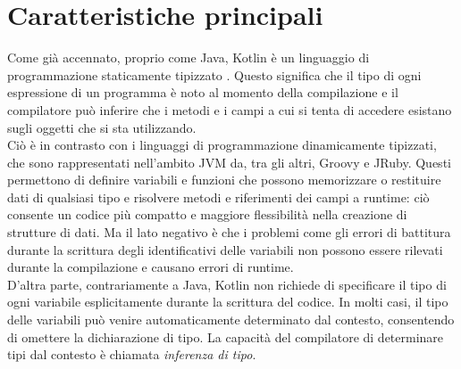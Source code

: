 \section{Caratteristiche principali}
Come già accennato, proprio come Java, Kotlin è un linguaggio di programmazione staticamente tipizzato \cite{kotlinWiki}.
Questo significa che il tipo di ogni espressione di un programma è noto al momento della compilazione
e il compilatore può inferire che i metodi e i campi a cui si tenta di accedere esistano sugli oggetti
che si sta utilizzando. \\
Ciò è in contrasto con i linguaggi di programmazione dinamicamente tipizzati, che sono
rappresentati nell'ambito JVM da, tra gli altri, Groovy e JRuby. Questi permettono di
definire variabili e funzioni che possono memorizzare o restituire dati di qualsiasi tipo e risolvere metodi
e riferimenti dei campi a runtime: ciò consente un codice più compatto e maggiore
flessibilità nella creazione di strutture di dati. Ma il lato negativo è che i problemi come gli errori
di battitura durante la scrittura degli identificativi delle variabili non possono essere rilevati durante
la compilazione e causano errori di runtime.\\
D'altra parte, contrariamente a Java, Kotlin non richiede di specificare il tipo di ogni variabile
esplicitamente durante la scrittura del codice. In molti casi, il tipo delle variabili può venire
automaticamente determinato dal contesto, consentendo di omettere la dichiarazione di tipo.
La capacità del compilatore di determinare tipi dal contesto è chiamata {\em inferenza di tipo}. \\

